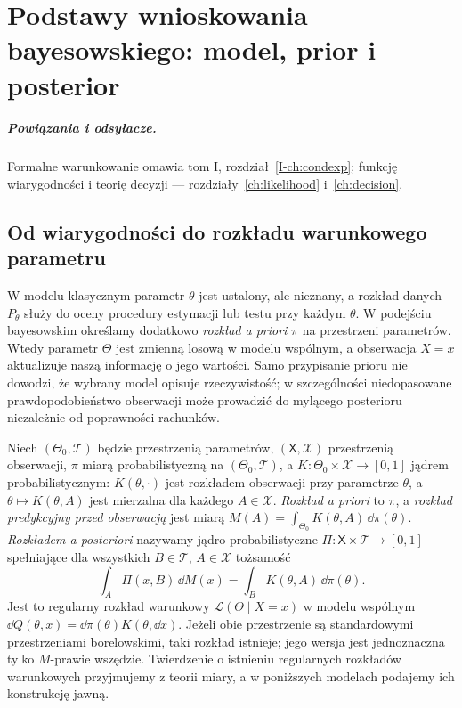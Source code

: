 \chapter{Podstawy wnioskowania bayesowskiego: model, prior i posterior}
\label{ch:bayes-foundations}
\paragraph{Powiązania i odsyłacze.} Formalne warunkowanie omawia tom I, rozdział~\ref{I-ch:condexp}; funkcję wiarygodności i teorię decyzji — rozdziały~\ref{ch:likelihood} i~\ref{ch:decision}.


\section{Od wiarygodności do rozkładu warunkowego parametru}
W modelu klasycznym parametr $\theta$ jest ustalony, ale nieznany,
a rozkład danych $P_\theta$ służy do oceny procedury estymacji lub
testu przy każdym $\theta$. W podejściu bayesowskim określamy dodatkowo
\emph{rozkład a priori} $\pi$ na przestrzeni parametrów. Wtedy parametr
$\Theta$ jest zmienną losową w modelu wspólnym, a obserwacja $X=x$
aktualizuje naszą informację o jego wartości. Samo przypisanie prioru
nie dowodzi, że wybrany model opisuje rzeczywistość; w szczególności
niedopasowane prawdopodobieństwo obserwacji może prowadzić do mylącego
posterioru niezależnie od poprawności rachunków.

\begin{definicja}
\label{def:bayes-model}
Niech $(\Theta_0,\mathcal T)$ będzie przestrzenią parametrów,
$(\mathsf X,\mathcal X)$ przestrzenią obserwacji, $\pi$ miarą
probabilistyczną na $(\Theta_0,\mathcal T)$, a
$K:\Theta_0\times\mathcal X\to[0,1]$ jądrem probabilistycznym:
$K(\theta,\cdot)$ jest rozkładem obserwacji przy parametrze $\theta$,
a $\theta\mapsto K(\theta,A)$ jest mierzalna dla każdego $A\in\mathcal X$.
\emph{Rozkład a priori} to $\pi$, a \emph{rozkład predykcyjny przed
obserwacją} jest miarą $M(A)=\int_{\Theta_0}K(\theta,A)\,\dd\pi(\theta)$.
\emph{Rozkładem a posteriori} nazywamy jądro probabilistyczne
$\Pi:\mathsf X\times\mathcal T\to[0,1]$ spełniające dla wszystkich
$B\in\mathcal T$, $A\in\mathcal X$ tożsamość
\[
 \int_A\Pi(x,B)\,\dd M(x)
 =\int_B K(\theta,A)\,\dd\pi(\theta).
\]
Jest to regularny rozkład warunkowy $\mathcal L(\Theta\mid X=x)$
w modelu wspólnym $\dd Q(\theta,x)=\dd\pi(\theta)K(\theta,\dd x)$.
Jeżeli obie przestrzenie są standardowymi przestrzeniami borelowskimi,
taki rozkład istnieje; jego wersja jest jednoznaczna tylko $M$-prawie
wszędzie. Twierdzenie o istnieniu regularnych rozkładów warunkowych
przyjmujemy z teorii miary, a w poniższych modelach podajemy ich
konstrukcję jawną.
\end{definicja}


